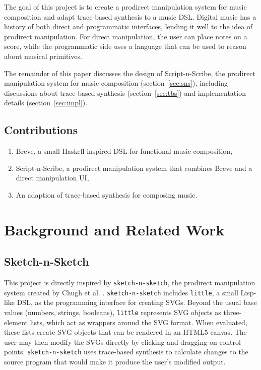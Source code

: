 \documentclass[nocopyrightspace,numbers,10pt]{sigplanconf}
\newcommand{\sketch}{\texttt{sketch-n-sketch}}
\newcommand{\lil}{\texttt{little}}
\newcommand{\sns}{Script-n-Scribe}
\begin{document}
The goal of this project is to create a prodirect manipulation system for music
composition and adapt trace-based synthesis to a music DSL. Digital music has a
history of both direct and programmatic interfaces, lending it well to the idea
of prodirect manipulation. For direct manipulation, the user can place notes on
a score, while the programmatic side uses a language that can be used to reason
about musical primitives.

The remainder of this paper discusses the design of \sns{}, the prodirect
manipulation system for music composition (section~\ref{sec:sns}), including
discussions about trace-based synthesis (section~\ref{sec:tbs}) and
implementation details (section~\ref{sec:impl}).

\subsection{Contributions}
\label{sub:intro:cont}

\begin{enumerate}
  \item Breve, a small Haskell-inspired DSL for functional music composition,
  \item \sns, a prodirect manipulation system that combines Breve and a
    direct manipulation UI,
  \item An adaption of trace-based synthesis for composing music.
\end{enumerate}


\section{Background and Related Work}
\label{sec:background}

\subsection{Sketch-n-Sketch}
\label{sub:background:sketch}

This project is directly inspired by \sketch, the prodirect
manipulation system created by Chugh et al. \cite{prodir}. \sketch{} includes
\lil, a small Lisp-like DSL, as the programming interface for creating SVGs.
Beyond the usual base values (numbers, strings, booleans), \lil{} represents SVG
objects as three-element lists, which act as wrappers around the SVG format.
When evaluated, these lists create SVG objects that can be rendered in an HTML5
canvas. The user may then modify the SVGs directly by clicking and dragging on
control points. \sketch{} uses trace-based synthesis to calculate changes to the
source program that would make it produce the user's modified output.
\end{document}
